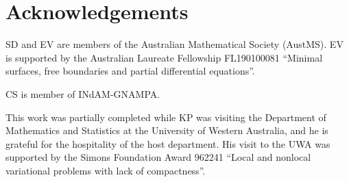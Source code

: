 \documentclass[12pt,a4paper,intlimits,sumlimits]{amsart}
\theoremstyle{definition}
\theoremstyle{plain}
\numberwithin{equation}{section}
\begin{document}
\section*{Acknowledgements} 

SD and EV are members of the Australian Mathematical Society (AustMS).
EV is supported by the Australian Laureate Fellowship FL190100081 ``Minimal surfaces, free boundaries and partial differential equations''.

CS is member of INdAM-GNAMPA.

This work was partially completed while KP was visiting the Department of Mathematics and Statistics at the University of Western Australia, and he is grateful for the hospitality of the host department. His visit to the UWA was supported by the Simons Foundation Award 962241 ``Local and nonlocal variational problems with lack of compactness''.
\end{document}
